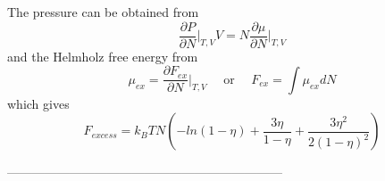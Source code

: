\documentclass[12pt]{article}
\begin{document}
The pressure can be obtained from \color{red}
\begin{equation}{\frac{\partial{P}}{\partial{N}}\bigg|_{T,V}V=N\frac{\partial\mu}{\partial{N}}\bigg|_{T,V}}\end{equation} \color{black}
and the Helmholz free energy from
\begin{displaymath}\mu_{ex}=\frac{\partial{F_{ex}}}{\partial{N}}\bigg|_{T,V}{~~~~~~}\text{or}{~~~~~~}F_{ex}=\int{\mu_{ex}dN}\end{displaymath}
which gives
\begin{equation}F_{excess}=k_BTN\left(-ln(1-\eta)+\frac{3\eta}{1-\eta}+\frac{3{\eta}^2}{2(1-\eta)^2}\right)\end{equation} 

------------------------------------------------------------------
\end{document}
